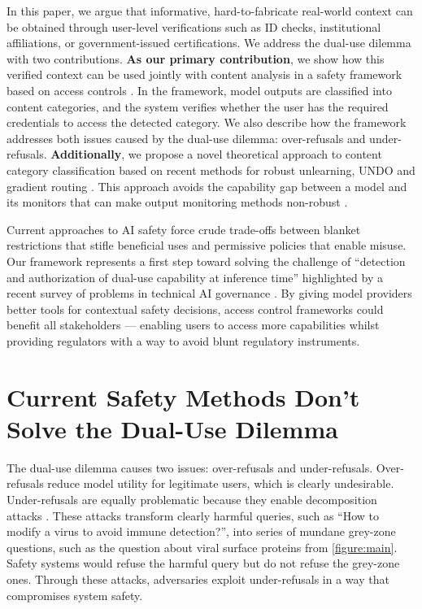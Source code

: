 \documentclass{article}
\theoremstyle{plain}
\theoremstyle{definition}
\theoremstyle{remark}
\begin{document}
In this paper, we argue that informative, hard-to-fabricate real-world context can be obtained through user-level verifications such as ID checks, institutional affiliations, or government-issued certifications.
We address the dual-use dilemma with two contributions.
\textbf{As our primary contribution}, we show how this verified context can be used jointly with content analysis in a safety framework based on access controls \cite{butler1974}.
In the framework, model outputs are classified into content categories, and the system verifies whether the user has the required credentials to access the detected category.
We also describe how the framework addresses both issues caused by the dual-use dilemma: over-refusals and under-refusals.
\textbf{Additionally}, we propose a novel theoretical approach to content category classification based on recent methods for robust unlearning, UNDO \cite{lee2025distillationrobustifiesunlearning} and gradient routing \cite{cloud2024gradientroutingmaskinggradients}.
This approach avoids the capability gap between a model and its monitors that can make output monitoring methods non-robust \cite{jin2024jailbreakinglargelanguagemodels}.

Current approaches to AI safety force crude trade-offs between blanket restrictions that stifle beneficial uses and permissive policies that enable misuse.
Our framework represents a first step toward solving the challenge of ``detection and authorization of dual-use capability at inference time'' highlighted by a recent survey of problems in technical AI governance \cite{reuel2025openproblemstechnicalai}.
By giving model providers better tools for contextual safety decisions, access control frameworks could benefit all stakeholders --- enabling users to access more capabilities whilst providing regulators with a way to avoid blunt regulatory instruments.

\section{Current Safety Methods Don't Solve the Dual-Use Dilemma}
\label{section:current-methods}

The dual-use dilemma causes two issues: over-refusals and under-refusals.
Over-refusals reduce model utility for legitimate users, which is clearly undesirable.
Under-refusals are equally problematic because they enable decomposition attacks \cite{glukhov2023llmcensorshipmachinelearning, glukhov2024breachthousandleaksunsafe}.
These attacks transform clearly harmful queries, such as ``How to modify a virus to avoid immune detection?'', into series of mundane grey-zone questions, such as the question about viral surface proteins from \cref{figure:main}.
Safety systems would refuse the harmful query but do not refuse the grey-zone ones.
Through these attacks, adversaries exploit under-refusals in a way that compromises system safety.
\end{document}
